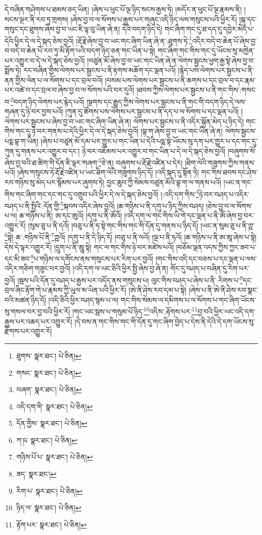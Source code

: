 དེ་བཞིན་གཤེགས་པ་ཐམས་ཅད་ཡིན། །ཞེས་པ་ཕུང་པོ་ལྔ་ཉིད་སངས་རྒྱས་ཏེ། །མདོར་ན་ཕུང་པོ་ལྔ་རྣམས་ནི། །སངས་ལྔར་ནི་རབ་ཏུ་གྲགས། །ཞེས་བྱ་བ་ལ་སོགས་པ་རྒྱས་པར་གཞུང་འདི་ཉིད་ལས་གསུངས་པའི་ཕྱིར་རོ། །སྐུ་དང་གསུང་དང་ཐུགས་ཞེས་བྱ་བ་ཡང་ཇི་ལྟ་བུ་ཡིན་ཞེ་ན། དེའི་བདག་ཉིད་དེ། གང་ཞིག་གང་དུ་ཐ་དད་དུ་དབྱེར་མེད་པ་དེའི་ཕྱིར་དེ་ལ་དེ་སྐད་ཅེས་བྱའོ། །རྡོ་རྗེ་ཞེས་བྱ་བ་ཡང་གང་ཞིག་ཡིན་ཞེ་ན་:ཐུགས་ཏེ་\footnote{ཐུགས་  སྣར་ཐང་།  པེ་ཅིན། }འདིར་བདེ་བ་ཆེན་པོ་ཞེས་བྱ་བ་བདེ་བ་ཆེན་པོ་རབ་ཏུ་མི་རྟོག་པའི་བདག་ཉིད་ཅན་གང་ཡིན་པ་སྟེ། གང་ཞིག་གང་གིས་གང་དུ་ཡོངས་སུ་མཁྱེན་པར་འགྱུར་བ་དེ་ལ་དེ་སྐད་ཅེས་བྱའོ། །བཙུན་མོ་ཞེས་བྱ་བ་ཡང་གང་ཡིན་ཞེ་ན་ལེགས་སྦྱངས་ཕྱག་རྒྱ་སྟེ་ཞེས་བྱ་བ་སྨོས་ཏེ། རང་བཞིན་གྱིས་ལེགས་པར་སྦྱངས་པ་ནི་རྟགས་མཆོག་དང་ལྡན་པའོ། །རྙེད་པས་ལེགས་པར་སྦྱངས་པ་ནི་ནན་གྱིས་ལེན་པ་ལ་སོགས་པ་དང་བྲལ་བའོ། །བསམ་པས་ལེགས་པར་སྦྱངས་པ་ནི་ཆགས་པ་དང་བྲལ་བ་དང་རྣམ་པར་འཚེ་བ་དང་བྲལ་བ་ཞེས་བྱ་བ་ལ་སོགས་པའི་བར་དུའོ། །ཐབས་ཀྱིས་ལེགས་པར་སྦྱངས་པ་ནི་གང་གིས་:གསང་བ་\footnote{གསང་  སྣར་ཐང་།  པེ་ཅིན། }བདག་ཉིད་ལེགས་པར་རྙེད་པའོ། །སྔགས་དང་རྒྱུད་ཀྱིས་ལེགས་པར་སྦྱངས་པ་ནི་གང་གི་བདག་ཉིད་དེ་ལས་གཞན་དུ་ཉེ་བར་བྱས་པའོ། །ཀུན་དུ་ཚོགས་པས་ལེགས་པར་སྦྱངས་པ་ནི་དད་པ་ལ་སོགས་པ་དང་ལྡན་པའོ། །ལེགས་པར་སྦྱངས་པ་ཞེས་བྱ་བ་ཡང་གང་ཞིག་ཡིན་ཞེ་ན། ལེགས་པར་སྦྱངས་པ་ནི་འདིར་སྐྱོན་མེད་པ་ཉིད་དེ། གང་གིས་གང་དུ་ཉེ་བར་གནས་པ་དེའི་ཕྱིར་དེ་ལ་དེ་སྐད་ཅེས་བྱའོ། །བྷ་ག་ཞེས་བྱ་བ་ཡང་གང་ཡིན་ཞེ་ན། ལེགས་སྦྱངས་པདྨ་བྷ་ག་ཡིན། །ཞེས་པ་བཙུན་མོ་དམ་པར་གྱུར་པ་གང་ཡིན་པ་དེའི་པདྨ་སྟེ་ཡོངས་སུ་དག་པར་གྱུར་པ་དང་གང་དུ་ཀུན་དུ་གནས་པར་འགྱུར་བ་དང་། ཉེ་བར་འཇོམས་པར་འགྱུར་བ་གང་ཡིན་པ་དེ་ལ་དེ་སྐད་ཅེས་བྱའོ། །བཞུགས་སོ་ཞེས་བྱ་བའི་ཐ་ཚིག་གི་དོན་ཇི་ལྟར་གཞག་\footnote{བཞག་  སྣར་ཐང་།  པེ་ཅིན། }ཅེ་ན། བཞུགས་པ་རྡོ་རྗེ་འཛིན་པ་དེར། །ཐིག་ལེའི་གཟུགས་ཀྱིས་གནས་པའོ། །ཞེས་གསུངས་ཏེ་རྡོ་རྗེ་འཛིན་པ་ཡང་ཐིག་ལེའི་གཟུགས་ཉིད་དོ། །འདི་སྐད་དུ་སྟོན་ཏེ། གང་གིས་ཐབས་དང་ཤེས་རབ་གཉིས་སུ་མེད་པར་སྙོམས་པར་ཞུགས་ཏེ། བྱང་ཆུབ་ཀྱི་སེམས་བཙུན་མོའི་བྷ་ག་ལ་གནས་པའོ། །ཡང་ན་གང་གིས་གང་ཞིག་གང་དང་གང་དུ་འགྲུབ་པའི་ཕྱིར་དེ་ལ་དེ་སྐད་ཅེས་བྱའོ། །:འདི་དག་གིས་\footnote{འདི་དག་གི་  སྣར་ཐང་།  པེ་ཅིན། }ཉེ་བར་བཤད་པ་འདིར་བཤད་པ་ནི་སྤྱིའི་:དོན་གྱི་\footnote{དོན་གྱིས་  སྣར་ཐང་།  པེ་ཅིན། }སྐབས་འདིར་ཞེས་བྱའོ། །ཆ་གཉིས་པ་ནི་དགུ་པ་ཉིད་ཀྱིས་བཤད། །ཅེས་བྱ་བ་ལ་སོགས་པ་ལ། ཆ་གཉིས་པ་ནི། ཨ་དང་ཨུའོ། །དགུ་པ་ནི་ཨོའོ། །འདི་དག་ལ་གང་གིས་ཡི་གེ་དང་ལྡན་པ་ནི་ཨོཾ་ཞེས་བྱ་བར་འགྱུར་རོ། །སུམ་ཅུ་པ་ནི་དའོ། །བཅུ་པ་ནི་ཧ་སྟེ་གང་གིས་གང་གི་དོན་དུ་གནས་པ་ཉིད་དོ། །ཡང་ན་སུམ་ཅུ་པ་ནི་ཀྵ་\footnote{ཀ་ཥ་  སྣར་ཐང་།  པེ་ཅིན། }སྟེ། ཆ་:གཉིས་པོ་ནི་\footnote{གཉིས་པོ་པ་  སྣར་ཐང་།  པེ་ཅིན། }ཀྵའོ། །དགུ་པ་ནི་དེ་ཉིད་དོ། །བཅུ་པ་ནི་ལའོ། །ལྔ་པ་ནི་ཧའོ། །ཆ་གཉིས་པ་ནི་ཨ་ཨཱ་ཞེས་པ་སྟེ། དེས་དེ་ལྟར་འགྱུར་རོ། །དྲུག་པ་ནི་ཨཱུ་སྟེ། གང་ལ་གང་གིས་ཉེ་བར་མཛེས་པའོ། །བཅོམ་ལྡན་འདས་ཀྱིས་ཀྱང་ཟབ་པ་དང་མི་ཟབ་\footnote{ཟད་  སྣར་ཐང་། }པ་གཉིས་ལ་དགོངས་ནས་གསུངས་པར་རིག་པར་བྱའོ། །གང་གིས་འདི་དང་བཅས་པ་དང་ལྡན་པ་ལས་འདིར་གཅིག་གཟུང་བར་བྱའོ། །འདི་དག་ལ་ཡང་ཅིའི་ཕྱིར་སྤྱི་ཞེས་བྱ་ཞེ་ན། གོང་དུ་བཤད་པ་བཞིན་དུ་རིག་པར་བྱའོ། །སྦས་པའི་དོན་དུ་བཤད་པ་རྒྱས་པར་འདོད་ནས་གསུངས་པ། ལུང་གིས་བཤད་པ་ཞེས་པ་ནི་:རིགས་པ་\footnote{རིག་པ་  སྣར་ཐང་།  པེ་ཅིན། }དང་བྲལ་ཞིང་རྟོག་གེ་པ་རྣམས་ཀྱི་ཡུལ་མ་ཡིན་པའི་ཕྱིར་རོ། །ཨེ་ནི་ཤེས་རབ་དམ་པ་སྟེ། །ཞེས་པ་ནི་ཨེ་ནི་ཤེས་རབ་སྣང་བའི་མཚན་ཉིད་དོ། །འདི་ཅིའི་ཕྱིར་བཤད་སྙམ་པ་ལ། གང་གིས་སེམས་ལ་དམིགས་པ་ལ་སོགས་པ་གང་ཞིག་ཡོངས་སུ་གསལ་བར་བྱ་བའི་ཕྱིར་རོ། །གང་ཡང་སྦས་པ་གསུམ་པོ་ཉིད་\footnote{ཉིད་ལ་  སྣར་ཐང་།  པེ་ཅིན། }འདིས་:རྟོགས་པར་\footnote{རྟོག་པར་  སྣར་ཐང་།  པེ་ཅིན། }བྱ་བའི་ཕྱིར་ཡང་འདི་དག་རྒྱས་པར་འཆད་པར་འགྱུར་རོ། །དེ་བས་ན་གང་གིས་གང་གི་དོན་དུ་གང་ཞིག་བྱེད་པ་དེས་ནི་དེའི་དེ་དག་ཡོངས་སུ་རྫོགས་པར་འགྱུར་རོ། 